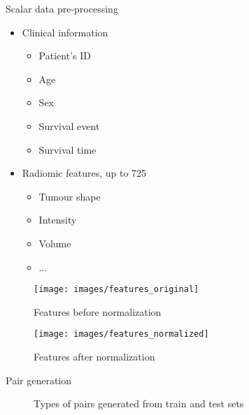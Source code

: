 \begin{frame}{Scalar data pre-processing}
  \begin{itemize}
    \item Clinical information
    \begin{itemize}
      \item Patient's ID
      \item Age
      \item Sex
      \item Survival event
      \item Survival time
    \end{itemize}
    \item Radiomic features, up to 725
    \begin{itemize}
      \item Tumour shape
      \item Intensity
      \item Volume
      \item ...
    \end{itemize}
  \end{itemize}
\end{frame}
\begin{frame}
  \begin{figure}
    \centering
    \texttt{[image: images/features\_original]}
    \caption{Features before normalization}
  \end{figure}
\end{frame}
\begin{frame}
  \begin{figure}
    \centering
    \texttt{[image: images/features\_normalized]}
    \caption{Features after normalization}
  \end{figure}
\end{frame}

\begin{frame}{Pair generation}
  
  \begin{figure}
    \centering
    
    \caption{Types of pairs generated from train and test sets}
  \end{figure}
\end{frame}

